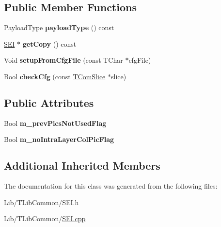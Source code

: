 \subsection*{Public Member Functions}
\begin{DoxyCompactItemize}
\item 
\mbox{\label{class_s_e_i_temporal_mv_prediction_constraints_aaef82f1995edad600bea0b3ccccf5044}} 
Payload\+Type {\bfseries payload\+Type} () const
\item 
\mbox{\label{class_s_e_i_temporal_mv_prediction_constraints_af9a84ceb2defe652c8aa1ec096b2e5c3}} 
\hyperlink{class_s_e_i}{S\+EI} $\ast$ {\bfseries get\+Copy} () const
\item 
\mbox{\label{class_s_e_i_temporal_mv_prediction_constraints_a4e0cc1db558044b3f0b9b921111442c9}} 
Void {\bfseries setup\+From\+Cfg\+File} (const T\+Char $\ast$cfg\+File)
\item 
\mbox{\label{class_s_e_i_temporal_mv_prediction_constraints_a5eb628e99d00ba8d59c0252a89b6a683}} 
Bool {\bfseries check\+Cfg} (const \hyperlink{class_t_com_slice}{T\+Com\+Slice} $\ast$slice)
\end{DoxyCompactItemize}
\subsection*{Public Attributes}
\begin{DoxyCompactItemize}
\item 
\mbox{\label{class_s_e_i_temporal_mv_prediction_constraints_ad9d2f2a10a674af67592c09299209ae5}} 
Bool {\bfseries m\+\_\+prev\+Pics\+Not\+Used\+Flag}
\item 
\mbox{\label{class_s_e_i_temporal_mv_prediction_constraints_af5e05fb982c0738b378af0aee4ae2c46}} 
Bool {\bfseries m\+\_\+no\+Intra\+Layer\+Col\+Pic\+Flag}
\end{DoxyCompactItemize}
\subsection*{Additional Inherited Members}


The documentation for this class was generated from the following files\+:\begin{DoxyCompactItemize}
\item 
Lib/\+T\+Lib\+Common/S\+E\+I.\+h\item 
Lib/\+T\+Lib\+Common/\hyperlink{_s_e_i_8cpp}{S\+E\+I.\+cpp}\end{DoxyCompactItemize}
